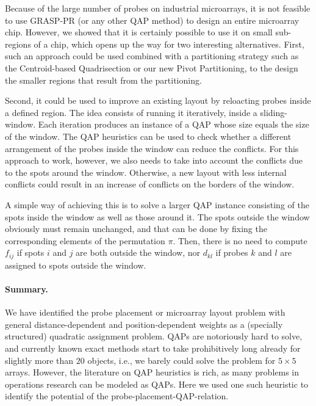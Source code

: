 \documentclass[english]{lni}
\begin{document}
Because of the large number of probes on industrial microarrays, it is not
feasible to use GRASP-PR (or any other QAP method) to design an
entire microarray chip. However, we showed that it is certainly possible to use
it on small sub-regions of a chip, which opens up the way for two interesting
alternatives. First, such an approach could be used combined with a partitioning
strategy such as the Centroid-based Quadrisection or our new Pivot Partitioning,
to the design the smaller regions that result from the partitioning.

Second, it could be used to improve an existing layout by reloacting probes
inside a defined region. The idea consists of running it iteratively, inside a
sliding-window. Each iteration produces an instance of a QAP whose size equals
the size of the window. The QAP heuristics can be used to check whether
a different arrangement of the probes inside the window can reduce the conflicts.
For this approach to work, however, we also needs to take
into account the conflicts due to the spots around the window. Otherwise, a
new layout with less internal conflicts could result in an increase of conflicts
on the borders of the window.

A simple way of achieving this is to solve a larger QAP instance
consisting of the spots inside the window as well as those around it. The
spots outside the window obviously must remain unchanged, and that can be done
by fixing the corresponding elements of the permutation $\pi$. Then,
there is no need to compute $f_{ij}$ if spots $i$ and $j$ are both outside the
window, nor $d_{kl}$ if probes $k$ and $l$ are assigned to spots outside the
window.

\paragraph{Summary.}
We have identified the probe placement or microarray layout problem with
general distance-dependent and position-dependent weights as a (specially
structured) quadratic assignment problem. QAPs are notoriously hard to solve,
and currently known exact methods start to take prohibitively long already for
slightly more than $20$ objects, i.e., we barely could solve the problem for
$5\times 5$ arrays. However, the literature on QAP heuristics is rich,
as many problems in operations research can be modeled as QAPs. Here we used
one such heuristic to identify the potential of the
probe-placement-QAP-relation.
\end{document}
